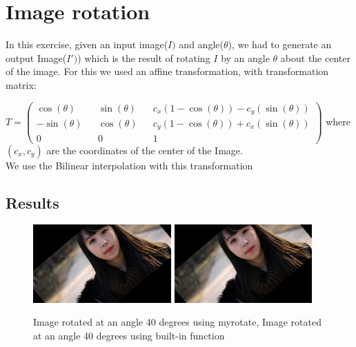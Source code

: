 \documentclass[paper=a4, fontsize=11pt]{scrartcl} %
\numberwithin{equation}{section} %
\numberwithin{figure}{section} %
\numberwithin{table}{section} %
\begin{document}
\section{Image rotation}

In this exercise, given an input image(\(I)\) and angle(\(\theta\)), we had to generate an output Image(\(I')\)) which is the result of rotating \(I\) by an angle \(\theta\) about the center of the image. For this we used an affine transformation, with transformation matrix:

\(
  T = 
  \begin{pmatrix}
    \cos(\theta) && \sin(\theta) && c_x(1-\cos(\theta)) - c_y(\sin(\theta)) \\
    -\sin(\theta) && \cos(\theta) && c_y(1 - \cos(\theta)) + c_x(\sin(\theta)) \\
    0 && 0 && 1
  \end{pmatrix}
\) 
where \((c_x,c_y)\) are the coordinates of the center of the Image.\\
We use the Bilinear interpolation with this transformation


\subsection{Results}
  \begin{figure}[h!]   
    \centering
    \includegraphics[clip,height=3cm]{rotate40}
    \includegraphics[clip,height=3cm]{scvrotate40}
    \caption{Image rotated at an angle 40 degrees using myrotate, Image rotated at an angle 40 degrees using built-in function}
   \end{figure}

\end{document}
